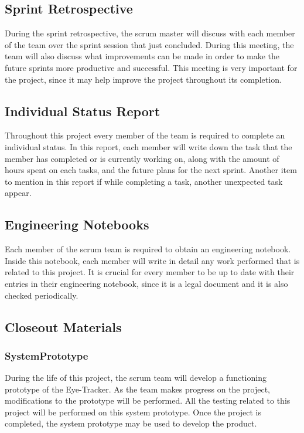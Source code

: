 \subsection{Sprint Retrospective}
During the sprint retrospective, the scrum master will discuss with each member of the team over the sprint session that just concluded. During this meeting, the team will also discuss what improvements can be made in order to make the future sprints more productive and successful. This meeting is very important for the project, since it may help improve the project throughout its completion. 

\subsection{Individual Status Report}
Throughout this project every member of the team is required to complete an individual status. In this report, each member will write down the task that the member has completed or is currently working on, along with the amount of hours spent on each tasks, and the future plans for the next sprint. Another item to mention in this report if while completing a task, another unexpected task appear.

\subsection{Engineering Notebooks}
Each member of the scrum team is required to obtain an engineering notebook. Inside this notebook, each member will write in detail any work performed that is related to this project. It is crucial for every member to be up to date with their entries in their engineering notebook, since it is a legal document and it is also checked periodically. 

\subsection{Closeout Materials}

\subsubsection{SystemPrototype}
During the life of this project, the scrum team will develop a functioning prototype of the Eye-Tracker. As the team makes progress on the project, modifications to the prototype will be performed. All the testing related to this project will be performed on this system prototype. Once the project is completed, the system prototype may be used to develop the product. 

